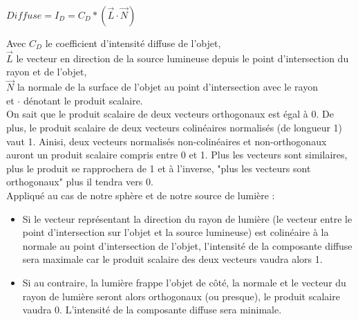 \documentclass[11pt]{article}
\begin{document}
\begin{center}
	$Diffuse = I_D = C_D*(\overrightarrow{L}\cdot\overrightarrow{N})$
\end{center}
Avec $C_D$ le coefficient d'intensité diffuse de l'objet,\\
$\overrightarrow{L}$ le vecteur en direction de la source lumineuse depuis le point d'intersection du rayon et de l'objet,\\
$\overrightarrow{N}$ la normale de la surface de l'objet au point d'intersection avec le rayon\\
et $\cdot$ dénotant le produit scalaire.\\
On sait que le produit scalaire de deux vecteurs orthogonaux est égal à 0. De plus, le produit scalaire de deux vecteurs colinéaires normalisés (de longueur 1) vaut 1. Ainisi, deux vecteurs normalisés non-colinéaires et non-orthogonaux auront un produit scalaire compris entre 0 et 1. Plus les vecteurs sont similaires, plus le produit se rapprochera de 1 et à l'inverse, "plus les vecteurs sont orthogonaux" plus il tendra vers 0.\\
Appliqué au cas de notre sphère et de notre source de lumière :\\
\begin{itemize}
	\item{Si le vecteur représentant la direction du rayon de lumière (le vecteur entre le point d'intersection sur l'objet et la source lumineuse) est colinéaire à la normale au point d'intersection de l'objet, l'intensité de la composante diffuse sera maximale car le produit scalaire des deux vecteurs vaudra alors 1.}
	\item{Si au contraire, la lumière frappe l'objet de côté, la normale et le vecteur du rayon de lumière seront alors orthogonaux (ou presque), le produit scalaire vaudra 0. L'intensité de la composante diffuse sera minimale.}
\end{itemize}
\end{document}
